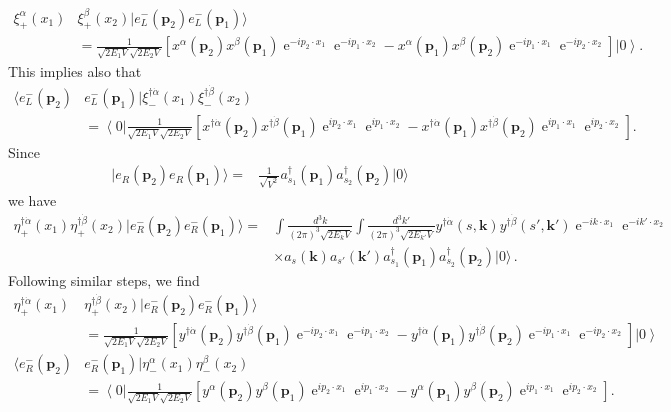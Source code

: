 \begin{align}
\label{eq:belel}
  \xi^\alpha_+(x_1)&\xi^\beta_+(x_2)|e_L^-(\mathbf{p}_2)e_L^-(\mathbf{p}_1)\rangle
 \nonumber\\
&=\frac{1 }{\sqrt{2 E_1V}\sqrt{2 E_2V}} \left[ x^{\alpha}(\mathbf{p}_2)x^{\beta}(\mathbf{p}_1)
\operatorname{e}^{-i p_2\cdot x_1}\operatorname{e}^{-i p_1\cdot x_2}
- x^{\alpha}(\mathbf{p}_1)x^{\beta}(\mathbf{p}_2)
\operatorname{e}^{-i p_1\cdot x_1}\operatorname{e}^{-i p_2\cdot x_2}   \right] \left|0\right\rangle.
\end{align}
This implies also that
\begin{align}
\label{eq:kelel}
 \langle e_L^-(\mathbf{p}_2)&e_L^-(\mathbf{p}_1) |  \xi^{\dagger\dot{\alpha}}_-  (x_1)\xi^{\dagger\dot{\beta}}_-(x_2) \nonumber\\
&=\left\langle 0\right|\frac{1 }{\sqrt{2 E_1V}\sqrt{2 E_2V}}  \left[x^{\dagger\dot{\alpha}}(\mathbf{p}_2)x^{\dagger\dot{\beta}}(\mathbf{p}_1)
\operatorname{e}^{i p_2\cdot x_1}\operatorname{e}^{i p_1\cdot x_2}
- x^{\dagger\dot{\alpha}}(\mathbf{p}_1)x^{\dagger\dot{\beta}}(\mathbf{p}_2)
\operatorname{e}^{i p_1\cdot x_1}\operatorname{e}^{i p_2\cdot x_2}   \right] .
\end{align}
Since
\begin{align}
  |e_R(\mathbf{p}_2)e_R(\mathbf{p}_1)\rangle=&\frac{1}{\sqrt{V^2}}a_{s_1}^\dagger(\mathbf{p}_1)a_{s_2}^\dagger(\mathbf{p}_2)|0\rangle
\end{align}
we have
\begin{align}
   \eta^{\dagger\dot{\alpha}}_+(x_1)\eta^{\dagger\dot{\beta}}_+(x_2)|e_R^-(\mathbf{p}_2)e_R^-(\mathbf{p}_1)\rangle=&
\int\frac{d^3k}{(2\pi)^3\sqrt{2E_k V}}\int\frac{d^3k'}{(2\pi)^3\sqrt{2E_{k'}V}}
y^{\dagger\dot{\alpha}}(s,\mathbf{k})y^{\dagger\dot{\beta}}(s',\mathbf{k}')\operatorname{e}^{-i k\cdot x_1}\operatorname{e}^{-i k'\cdot x_2}\nonumber\\
&\times a_s(\mathbf{k})a_{s'}(\mathbf{k}')a_{s_1}^\dagger(\mathbf{p}_1)a_{s_2}^\dagger(\mathbf{p}_2)|0\rangle \,.
\end{align}
Following similar steps, we find
\begin{align}
\eta^{\dagger\dot{\alpha}}_+(x_1)&\eta^{\dagger\dot{\beta}}_+(x_2)|e_R^-(\mathbf{p}_2)e_R^-(\mathbf{p}_1)\rangle
 \nonumber\\
\label{eq:berer}
&=\frac{1 }{\sqrt{2 E_1V}\sqrt{2 E_2V}} \left[ y^{\dagger\dot{\alpha}}(\mathbf{p}_2)y^{\dagger\dot{\beta}}(\mathbf{p}_1)
\operatorname{e}^{-i p_2\cdot x_1}\operatorname{e}^{-i p_1\cdot x_2}
-y^{\dagger\dot{\alpha}}(\mathbf{p}_1)y^{\dagger\dot{\beta}}(\mathbf{p}_2)
\operatorname{e}^{-i p_1\cdot x_1}\operatorname{e}^{-i p_2\cdot x_2}   \right] \left|0\right\rangle \\
\langle e_R^-(\mathbf{p}_2)&e_R^-(\mathbf{p}_1)| \eta^{\alpha}_-(x_1)\eta^{\beta}_-(x_2)
 \nonumber\\
\label{eq:berer}
&=\left\langle 0\right|\frac{1 }{\sqrt{2 E_1V}\sqrt{2 E_2V}} \left[ y^{\alpha}(\mathbf{p}_2)y^{\beta}(\mathbf{p}_1)
\operatorname{e}^{i p_2\cdot x_1}\operatorname{e}^{i p_1\cdot x_2}
- y^{\alpha}(\mathbf{p}_1)y^{\beta}(\mathbf{p}_2)
\operatorname{e}^{i p_1\cdot x_1}\operatorname{e}^{i p_2\cdot x_2}   \right].
\end{align}

